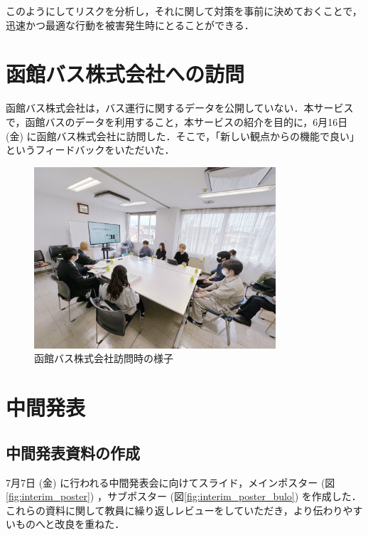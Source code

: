 このようにしてリスクを分析し，それに関して対策を事前に決めておくことで，迅速かつ最適な行動を被害発生時にとることができる．

\section{函館バス株式会社への訪問}
函館バス株式会社は，バス運行に関するデータを公開していない．本サービスで，函館バスのデータを利用すること，本サービスの紹介を目的に，6月16日 (金) に函館バス株式会社に訪問した．そこで，「新しい観点からの機能で良い」というフィードバックをいただいた．

\begin{figure}[H]
    \centering
    \includegraphics[width=9cm]{images/hakodate_bus.png}
    \caption{函館バス株式会社訪問時の様子}
    \label{fig:hakodate_bus}
\end{figure}

\section{中間発表}
\subsection{中間発表資料の作成}
7月7日 (金) に行われる中間発表会に向けてスライド，メインポスター (図\ref{fig:interim_poster}) ，サブポスター (図\ref{fig:interim_poster_bulo}) を作成した．これらの資料に関して教員に繰り返しレビューをしていただき，より伝わりやすいものへと改良を重ねた．

